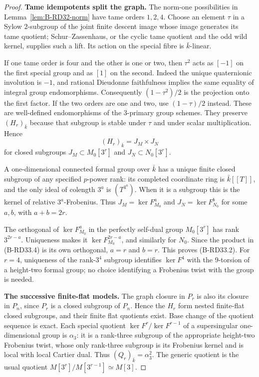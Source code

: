 \begin{proof}
\par\smallskip\noindent\textbf{Tame idempotents split the graph.}
The norm-one possibilities in Lemma~\ref{lem:B-RD32-norm}
have tame orders $1,2,4$. Choose an element $\tau$ in a
Sylow $2$-subgroup of the joint finite descent image whose
image generates its tame quotient; Schur--Zassenhaus, or
the cyclic tame quotient and the odd wild kernel, supplies
such a lift. Its action on the special fibre is
$\bar k$-linear.

If one tame order is four and the other is one or two,
then $\tau^2$ acts as $[-1]$ on the first special group
and as $[1]$ on the second. Indeed the unique quaternionic
involution is $-1$, and rational Dieudonne faithfulness
implies the same equality of integral group endomorphisms.
Consequently $(1-\tau^2)/2$ is the projection onto the
first factor. If the two orders are one and two, use
$(1-\tau)/2$ instead. These are well-defined endomorphisms
of the $3$-primary group schemes. They preserve
$(H_r)_{\bar k}$ because that subgroup is stable under
$\tau$ and under scalar multiplication. Hence
\[
                 (H_r)_{\bar k}=J_M\times J_N
                                                        \tag{B-RD33.4}
\]
for closed subgroups $J_M\subset M_0[3^r]$ and
$J_N\subset N_0[3^r]$.

A one-dimensional connected formal group over $\bar k$
has a unique finite closed subgroup of any specified
$p$-power rank: its completed coordinate ring is
$\bar k[[T]]$, and the only ideal of colength $3^a$ is
$(T^{3^a})$. When it is a subgroup this is the kernel of
relative $3^a$-Frobenius. Thus
$J_M=\ker F_{M_0}^a$ and $J_N=\ker F_{N_0}^b$ for some
$a,b$, with $a+b=2r$.

The orthogonal of $\ker F_{M_0}^a$ in the perfectly
self-dual group $M_0[3^r]$ has rank $3^{2r-a}$.
Uniqueness makes it $\ker F_{M_0}^{2r-a}$, and similarly
for $N_0$. Since the product in (B-RD33.4) is its own
orthogonal, $a=r$ and $b=r$. This proves (B-RD33.2).
For $r=4$, uniqueness of the rank-$3^4$ subgroup identifies
$\ker F^4$ with the $9$-torsion of a height-two formal group;
no choice identifying a Frobenius twist with the group is
needed.

\par\smallskip\noindent\textbf{The successive finite-flat models.}
The graph closure in $P_r$ is also its closure in $P_n$,
since $P_r$ is a closed subgroup of $P_n$. Hence the $H_r$
form nested finite-flat closed subgroups, and their finite
flat quotients exist. Base change of the quotient sequence
is exact. Each special quotient
$\ker F^r/\ker F^{r-1}$ of a supersingular one-dimensional
group is $\alpha_3$: it is a rank-three subgroup of the
appropriate height-two Frobenius twist, whose only
rank-three subgroup is its Frobenius kernel and is local
with local Cartier dual. Thus $(Q_r)_{\bar k}=\alpha_3^2$.
The generic quotient is the usual quotient
$M[3^r]/M[3^{r-1}]\simeq M[3]$.


\end{proof}
